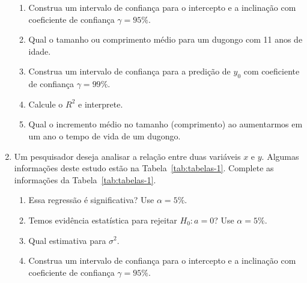 \documentclass[12pt, a4paper]{article}
\begin{document}
\begin{enumerate}
\begin{enumerate}
		\item Construa um intervalo de confiança para o intercepto e a inclinação com coeficiente de confiança $\gamma=95\%$.
		\item Qual o tamanho ou comprimento médio para um dugongo com 11 anos de idade.
		\item Construa um intervalo de confiança para a predição de $y_0$ com coeficiente de confiança $\gamma=99\%$.
		\item Calcule o $R^2$ e interprete.
		\item Qual o incremento médio no tamanho (comprimento) ao aumentarmos em um ano o tempo de vida de um dugongo.
	\end{enumerate}

	\item Um pesquisador deseja analisar a relação entre duas variáveis $x$ e $y$. Algumas informações deste estudo estão na Tabela~\ref{tab:tabelas-1}. Complete as informações da Tabela~\ref{tab:tabelas-1}.
	\begin{table}[htbp]
		\centering
		\caption{Algumas informações do experimento.}
		\label{tab:tabelas-1}
	\end{table}
	\begin{enumerate}
		\item Essa regressão é significativa? Use $\alpha = 5\%$.
		\item Temos evidência estatística para rejeitar $H_0: a = 0$? Use $\alpha=5\%$.
		\item Qual estimativa para $\sigma^2$.
		\item Construa um intervalo de confiança para o intercepto e a inclinação com coeficiente de confiança $\gamma=95\%$.
	\end{enumerate}


\end{enumerate}
\end{document}
